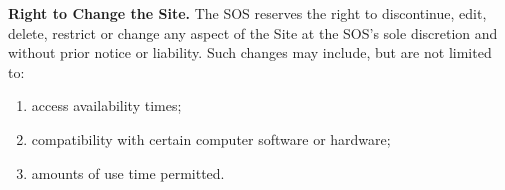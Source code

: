\textbf{Right to Change the Site.}
The SOS reserves the right to discontinue, edit, delete, restrict or change any
aspect of the Site at the SOS's sole discretion and without prior notice or
liability. Such changes may include, but are not limited to: 
\begin{enumerate}[label = {\EnumerateLabel}]
    \item access availability times;
    \item compatibility with certain computer software or hardware;
    \item amounts of use time permitted.
\end{enumerate}